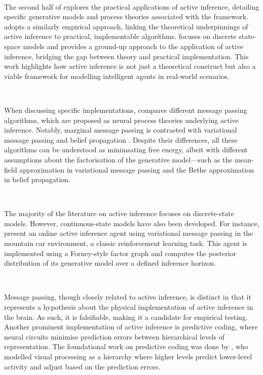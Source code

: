 \documentclass{article}
\begin{document}
\

The second half of \citet{parr2022ActiveInference} explores the practical applications of active inference, detailing specific generative models and process theories associated with the framework. \citet{smith2022} adopts a similarly empirical approach, linking the theoretical underpinnings of active inference to practical, implementable algorithms. \citet{dacosta2020active} focuses on discrete state-space models and provides a ground-up approach to the application of active inference, bridging the gap between theory and practical implementation. This work highlights how active inference is not just a theoretical construct but also a viable framework for modelling intelligent agents in real-world scenarios.

\

When discussing specific implementations, \citet{parr2019neuronal} compares different message passing algorithms, which are proposed as neural process theories underlying active inference. Notably, marginal message passing is contrasted with variational message passing \citep{winn2005variational} and belief propagation \citep{pearl1986prop}. Despite their differences, all these algorithms can be understood as minimsating free energy, albeit with different assumptions about the factorisation of the generative model—such as the mean-field approximation in variational message passing and the Bethe approximation in belief propagation.

\

The majority of the literature on active inference focuses on discrete-state models. However, continuous-state models have also been developed. For instance, \citet{van2019simulating} present an online active inference agent using variational message passing in the mountain car environment, a classic reinforcement learning task. This agent is implemented using a Forney-style factor graph and computes the posterior distribution of its generative model over a defined inference horizon.

\

Message passing, though closely related to active inference, is distinct in that it represents a hypothesis about the physical implementation of active inference in the brain. As such, it is falsifiable, making it a candidate for empirical testing. Another prominent implementation of active inference is predictive coding, where neural circuits minimise prediction errors between hierarchical levels of representation. The foundational work on predictive coding was done by \citet{rao1999predictive}, who modelled visual processing as a hierarchy where higher levels predict lower-level activity and adjust based on the prediction errors.
\
\end{document}
